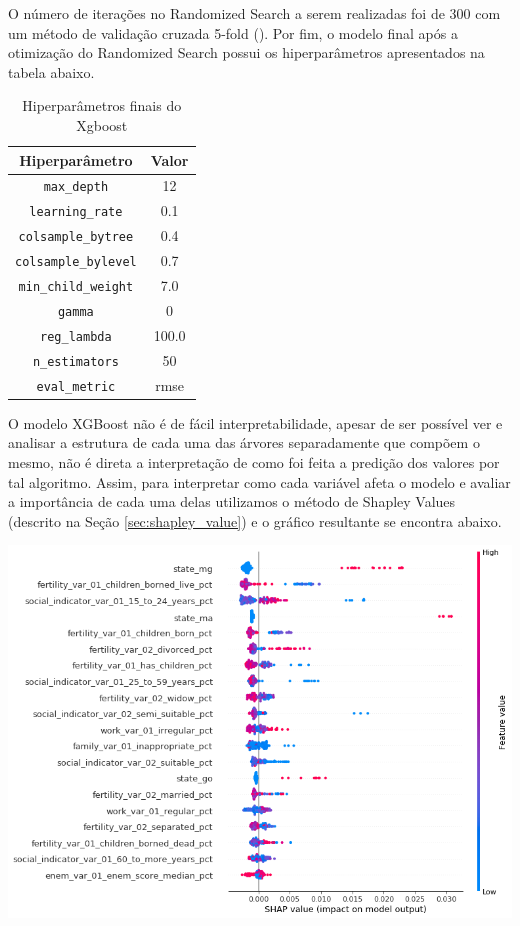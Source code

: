 O número de iterações no Randomized Search a serem realizadas foi de 300 com um método de validação cruzada 5-fold (\citet{Kohavi1995}). Por fim, o modelo final após a otimização do Randomized Search possui os hiperparâmetros apresentados na tabela abaixo.

\begin{table}[h]
\centering
\caption{Hiperparâmetros finais do Xgboost}
\label{tab:cap3_parametros_xgboost}
\begin{tabular}{cc}
Hiperparâmetro & Valor \\
\hline
\verb|max_depth| & 12 \\
\verb|learning_rate| & 0.1 \\
\verb|colsample_bytree| & 0.4 \\
\verb|colsample_bylevel| & 0.7 \\
\verb|min_child_weight| & 7.0 \\
\verb|gamma| & 0 \\
\verb|reg_lambda| & 100.0 \\
\verb|n_estimators| & 50 \\
\verb|eval_metric| & rmse \\
\hline
\end{tabular}
\end{table}
\FloatBarrier

O modelo XGBoost não é de fácil interpretabilidade, apesar de ser possível ver e analisar a estrutura de cada uma das árvores separadamente que compõem o mesmo, não é direta a interpretação de como foi feita a predição dos valores por tal algoritmo. Assim, para interpretar como cada variável afeta o modelo e avaliar a importância de cada uma delas utilizamos o método de Shapley Values (descrito na Seção \ref{sec:shapley_value}) e o gráfico resultante se encontra abaixo.

\graphicspath{ {./figuras/model_performance/} }
\begin{center}
\includegraphics[width=14.0cm, keepaspectratio]{cap3_shap_xgboost}
\label{ape:cap3_shap_xgboost}
\end{center}

